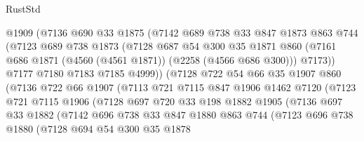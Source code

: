\begin{lexlean}{RustStd}
\begin{coremodule}
                  @1909
                  (@7136
                    @690
                    @33
                    @1875
                    (@7142
                      @689
                      @738
                      @33
                      @847
                      @1873
                      @863
                      @744
                      (@7123
                        @689
                        @738
                        @1873
                        (@7128
                          @687
                          @54
                          @300
                          @35
                          @1871
                          @860
                          (@7161 @686 @1871 (@4560 (@4561 @1871)) (@2258 (@4566 @686 @300)))
                          @7173))
                      @7177
                      @7180
                      @7183
                      @7185
                      @4999))
                  (@7128
                    @722
                    @54
                    @66
                    @35
                    @1907
                    @860
                    (@7136
                      @722
                      @66
                      @1907
                      (@7113
                        @721
                        @7115
                        @847
                        @1906
                        @1462
                        @7120
                        (@7123
                          @721
                          @7115
                          @1906
                          (@7128
                            @697
                            @720
                            @33
                            @198
                            @1882
                            @1905
                            (@7136
                              @697
                              @33
                              @1882
                              (@7142
                                @696
                                @738
                                @33
                                @847
                                @1880
                                @863
                                @744
                                (@7123
                                  @696
                                  @738
                                  @1880
                                  (@7128
                                    @694
                                    @54
                                    @300
                                    @35
                                    @1878

\end{coremodule}
\end{lexlean}

